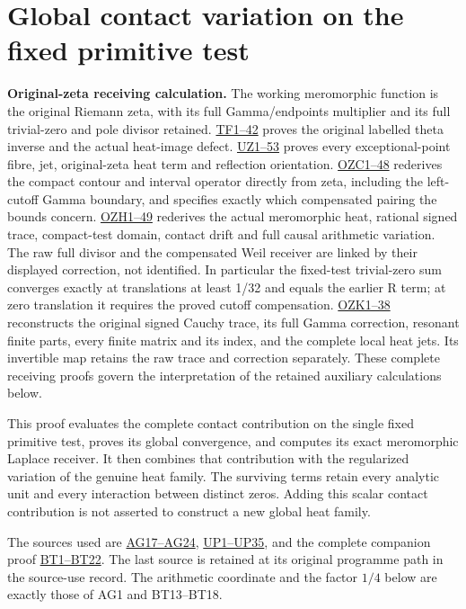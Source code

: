 \documentclass[
  10pt,
  a4paper,
]{article}
\author{}
\date{}
\begin{document}
{
\setcounter{tocdepth}{3}
\tableofcontents
}
\section{Global contact variation on the fixed primitive
test}\label{global-contact-variation-on-the-fixed-primitive-test}

\textbf{Original-zeta receiving calculation.} The working meromorphic
function is the original Riemann zeta, with its full Gamma/endpoints
multiplier and its full trivial-zero and pole divisor retained.
\href{FAITHFUL_THETA_COMPLETION_RETURN.md}{TF1--42} proves the original
labelled theta inverse and the actual heat-image defect.
\href{FAITHFUL_UNCOMPLETED_ZETA_HEAT.md}{UZ1--53} proves every
exceptional-point fibre, jet, original-zeta heat term and reflection
orientation.
\href{ORIGINAL_ZETA_COMPACT_WEIL_RECONSTRUCTION.md}{OZC1--48} rederives
the compact contour and interval operator directly from zeta, including
the left-cutoff Gamma boundary, and specifies exactly which compensated
pairing the bounds concern.
\href{ORIGINAL_ZETA_HEAT_CONTACT_RECONSTRUCTION.md}{OZH1--49} rederives
the actual meromorphic heat, rational signed trace, compact-test domain,
contact drift and full causal arithmetic variation. The raw full divisor
and the compensated Weil receiver are linked by their displayed
correction, not identified. In particular the fixed-test trivial-zero
sum converges exactly at translations at least 1/32 and equals the
earlier R term; at zero translation it requires the proved cutoff
compensation. \href{ORIGINAL_ZETA_CAUCHY_RECONSTRUCTION.md}{OZK1--38}
reconstructs the original signed Cauchy trace, its full Gamma
correction, resonant finite parts, every finite matrix and its index,
and the complete local heat jets. Its invertible map retains the raw
trace and correction separately. These complete receiving proofs govern
the interpretation of the retained auxiliary calculations below.

This proof evaluates the complete contact contribution on the single
fixed primitive test, proves its global convergence, and computes its
exact meromorphic Laplace receiver. It then combines that contribution
with the regularized variation of the genuine heat family. The surviving
terms retain every analytic unit and every interaction between distinct
zeros. Adding this scalar contact contribution is not asserted to
construct a new global heat family.

The sources used are
\href{ACTUAL_HEAT_ZERO_DISTRIBUTION_VARIATION.md}{AG17--AG24},
\href{UNIVERSAL_PRIMITIVE_TRANSLATION_CRITERION.md}{UP1--UP35}, and the
complete companion proof
\href{CONTACT_DEFECT_TRACE_VARIATION.tex}{BT1--BT22}. The last source is
retained at its original programme path in the source-use record. The
arithmetic coordinate and the factor \(1/4\) below are exactly those of
AG1 and BT13--BT18.
\end{document}
